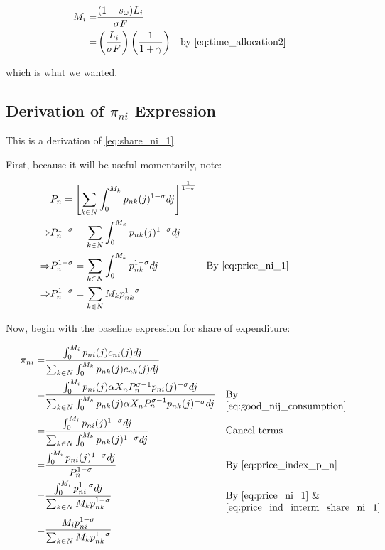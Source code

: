 \documentclass[10pt]{article}
\begin{document}
\begin{align}
    M_i = &\frac{(1-s_\omega)L_i}{\sigma F} \\
    = &\left(\frac{L_i}{\sigma F}\right) \left(\frac{1}{1+\gamma}\right) && \text{by \eqref{eq:time_allocation2}}
\end{align}

which is what we wanted. 



\subsection{Derivation of $\pi_{n i}$ Expression}
\label{sec:share_ni_1}

This is a derivation of \eqref{eq:share_ni_1}.

First, because it will be useful momentarily, note:

\begin{align}
    &P_n=\left[\sum_{k \in N} \int_0^{M_k} p_{n k}(j)^{1-\sigma} d j\right]^{\frac{1}{1-\sigma}} \\
    \Rightarrow &P_n^{1-\sigma} = \sum_{k \in N} \int_0^{M_k} p_{n k}(j)^{1-\sigma} d j \\
    \Rightarrow &P_n^{1-\sigma} = \sum_{k \in N} \int_0^{M_k} p_{nk}^{1-\sigma} d j && \parbox[t]{4cm}{\raggedright By \eqref{eq:price_ni_1}} \\
    \Rightarrow &P_n^{1-\sigma} = \sum_{k \in N} M_k p_{nk}^{1-\sigma} \label{eq:price_ind_interm_share_ni_1}
\end{align}

Now, begin with the baseline expression
for share of expenditure:

\begin{align}
    \pi_{n i}=&\frac{\int_0^{M_i} p_{n i}(j) c_{n i}(j) d j}{\sum_{k \in N} \int_0^{M_k} p_{n k}(j) c_{n k}(j) d j} \\
    = &\frac{\int_0^{M_i} p_{n i}(j) \alpha X_n P_n^{\sigma-1} p_{n i}(j)^{-\sigma} d j}{\sum_{k \in N} \int_0^{M_k} p_{n k}(j) \alpha X_n P_n^{\sigma-1} p_{n k}(j)^{-\sigma} d j} && \parbox[t]{4cm}{\raggedright By \eqref{eq:good_nij_consumption}} \\
    = &\frac{\int_0^{M_i} p_{ni}(j)^{1-\sigma} d j}{\sum_{k \in N} \int_0^{M_k} p_{nk}(j)^{1-\sigma} d j} && \parbox[t]{4cm}{\raggedright Cancel terms} \\
    = &\frac{\int_0^{M_i} p_{ni}(j)^{1-\sigma} d j}{P_n^{1-\sigma}} && \parbox[t]{4cm}{\raggedright By \eqref{eq:price_index_p_n}} \\
    = &\frac{\int_0^{M_i} p_{ni}^{1-\sigma} d j}{\sum_{k \in N} M_k p_{nk}^{1-\sigma}} && \parbox[t]{4cm}{\raggedright By \eqref{eq:price_ni_1} \& \eqref{eq:price_ind_interm_share_ni_1}} \\
    = &\frac{M_i p_{ni}^{1-\sigma}}{\sum_{k \in N} M_k p_{nk}^{1-\sigma}}
\end{align}
\end{document}
